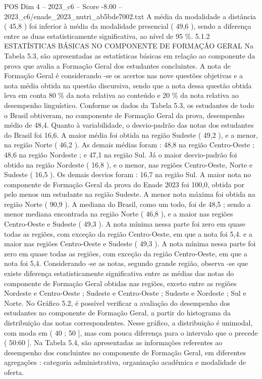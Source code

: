 \begin{textsample}{POS Dim 4 – 2023\_c6 – Score -8.00 – 2023\_c6/enade\_2023\_nutri\_ab5bde7002.txt}
A média da modalidade a distância ( 45,8 ) foi inferior à média da modalidade presencial ( 49,6 ), sendo a diferença entre as duas estatisticamente significativa, ao nível de 95 \%. 5.1.2 ESTATÍSTICAS BÁSICAS NO COMPONENTE DE FORMAÇÃO GERAL Na Tabela 5.3, são apresentadas as estatísticas básicas em relação ao componente da prova que avalia a Formação Geral dos estudantes concluintes.
A nota de Formação Geral é considerando -se os acertos nas nove questões objetivas e a nota média obtida na questão discursiva, sendo que a nota dessa questão obtida leva em conta 80 \% da nota relativa ao conteúdo e 20 \% da nota relativa ao desempenho linguístico.
Conforme os dados da Tabela 5.3, os estudantes de todo o Brasil obtiveram, no componente de Formação Geral da prova, desempenho médio de 48,4.
Quanto à variabilidade, o desvio-padrão das notas dos estudantes do Brasil foi 16,6.
A maior média foi obtida na região Sudeste ( 49,2 ), e a menor, na região Norte ( 46,2 ).
As demais médias foram : 48,8 na região Centro-Oeste ; 48,6 na região Nordeste ; e 47,1 na região Sul.
Já o maior desvio-padrão foi obtido na região Nordeste ( 16,8 ), e o menor, nas regiões Centro-Oeste, Norte e Sudeste ( 16,5 ).
Os demais desvios foram : 16,7 na região Sul.
A maior nota no componente de Formação Geral da prova do Enade 2023 foi 100,0, obtida por pelo menos um estudante na região Sudeste.
A menor nota máxima foi obtida na região Norte ( 90,9 ).
A mediana do Brasil, como um todo, foi de 48,5 ; sendo a menor mediana encontrada na região Norte ( 46,8 ), e a maior nas regiões Centro-Oeste e Sudeste ( 49,3 ).
A nota mínima nessa parte foi zero em quase todas as regiões, com exceção da região Centro-Oeste, em que a nota foi 5,4. e a maior nas regiões Centro-Oeste e Sudeste ( 49,3 ).
A nota mínima nessa parte foi zero em quase todas as regiões, com exceção da região Centro-Oeste, em que a nota foi 5,4.
Considerando -se as notas, segundo grande região, observa -se que existe diferença estatisticamente significativa entre as médias das notas do componente de Formação Geral obtidas nas regiões, exceto entre as regiões Nordeste e Centro-Oeste ; Sudeste e Centro-Oeste ; Sudeste e Nordeste ; Sul e Norte.
No Gráfico 5.2, é possível verificar a avaliação do desempenho dos estudantes no componente de Formação Geral, a partir do histograma da distribuição das notas correspondentes.
Nesse gráfico, a distribuição é unimodal, com moda em ( 40 ; 50 ], mas com pouca diferença para o intervalo que o precede ( 50:60 ].
Na Tabela 5.4, são apresentadas as informações referentes ao desempenho dos concluintes no componente de Formação Geral, em diferentes agregações : categoria administrativa, organização acadêmica e modalidade de oferta.

\end{textsample}
